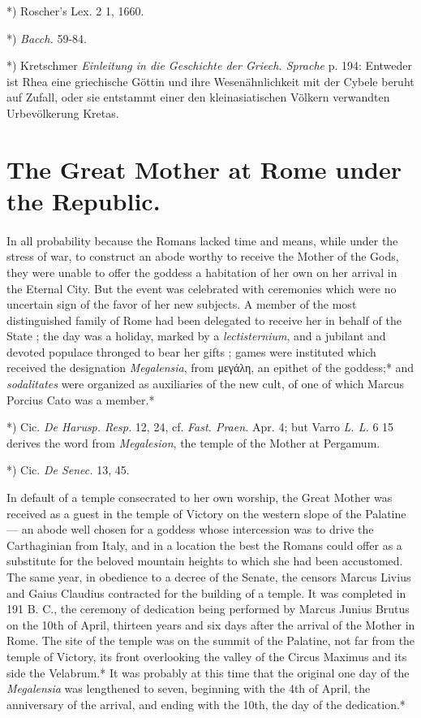 \documentclass[a4paper, 11pt, oneside, polutonikogreek, english]{article}
\begin{document}
*) Roscher's Lex. 2 1, 1660.

*) \emph{Bacch.} 59-84.

*) Kretschmer \emph{Einleitung in die Geschichte der Griech. Sprache} p. 194: Entweder ist Rhea eine griechische Göttin und ihre Wesenähnlichkeit mit der Cybele beruht auf Zufall, oder sie entstammt einer den kleinasiatischen Völkern verwandten Urbevölkerung Kretas.

\section{The Great Mother at Rome under the Republic.}
\paragraph{}
In all probability because the Romans lacked time and means, while under the stress of war, to construct an abode worthy to receive the Mother of the Gods, they were unable to offer the goddess a habitation of her own on her arrival in the Eternal City. But the event was celebrated with ceremonies which were no uncertain sign of the favor of her new subjects. A member of the most distinguished family of Rome had been delegated to receive her in behalf of the State ; the day was a holiday, marked by a \emph{lectisternium}, and a jubilant and devoted populace thronged to bear her gifts ; games were instituted which received the designation \emph{Megalensia}, from μεγάλη, an epithet of the goddess;* and \emph{sodalitates} were organized as auxiliaries of the new cult, of one of which Marcus Porcius Cato was a member.*

*) Cic. \emph{De Harusp. Resp.} 12, 24, cf. \emph{Fast. Praen.} Apr. 4; but Varro \emph{L. L.} 6 15 derives the word from \emph{Megalesion}, the temple of the Mother at Pergamum.

*) Cic. \emph{De Senec.} 13, 45.

In default of a temple consecrated to her own worship, the Great Mother was received as a guest in the temple of Victory on the western slope of the Palatine --- an abode well chosen for a goddess whose intercession was to drive the Carthaginian from Italy, and in a location the best the Romans could offer as a substitute for the beloved mountain heights to which she had been accustomed. The same year, in obedience to a decree of the Senate, the censors Marcus Livius and Gaius Claudius contracted for the building of a temple. It was completed in 191 B. C., the ceremony of dedication being performed by Marcus Junius Brutus on the 10th of April, thirteen years and six days after the arrival of the Mother in Rome. The site of the temple was on the summit of the Palatine, not far from the temple of Victory, its front overlooking the valley of the Circus Maximus and its side the Velabrum.* It was probably at this time that the original one day of the \emph{Megalensia} was lengthened to seven, beginning with the 4th of April, the anniversary of the arrival, and ending with the 10th, the day of the dedication.*
\end{document}
